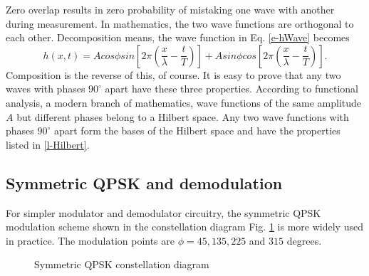 \documentclass[oneside, letter, 12pt]{book}
\begin{document}
Zero overlap results in zero probability of mistaking one wave with another during measurement. In mathematics, the two wave functions are orthogonal to each other. Decomposition means, the wave function in Eq. \ref{e-hWave} becomes
\begin{equation}\label{e-hWave}
    h(x,t) = A cos\phi sin[2\pi (\frac x \lambda - \frac t T)] + A sin\phi cos[2\pi (\frac x \lambda - \frac t T)].
\end{equation}
Composition is the reverse of this, of course. It is easy to prove that any two waves with phases $90^\circ$ apart have these three properties. According to functional analysis, a modern branch of mathematics, wave functions of the same amplitude $A$ but different phases belong to a Hilbert space. Any two wave functions with phases $90^\circ$ apart form the bases of the Hilbert space and have the properties listed in \ref{l-Hilbert}.

\subsection{Symmetric QPSK and demodulation}
For simpler modulator and demodulator circuitry, the symmetric QPSK modulation scheme shown in the constellation diagram Fig. \ref{sQPSK} is more widely used in practice. The modulation points are $\phi = 45, 135, 225$ and $315$ degrees.
\begin{figure}[h]\label{sQPSK}
\caption{Symmetric QPSK constellation diagram}
\end{figure}
\end{document}
